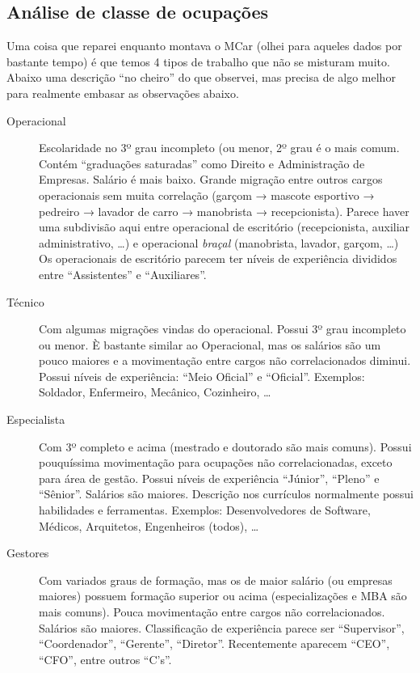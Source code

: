 \documentclass[12pt,a4paper]{article}
\begin{document}
\subsection{Análise de classe de ocupações}

Uma coisa que reparei enquanto montava o MCar (olhei para aqueles dados por bastante tempo) é que temos 4 tipos de trabalho que não se misturam muito. Abaixo uma descrição \enquote{no cheiro} do que observei, mas precisa de algo melhor para realmente embasar as observações abaixo.


\begin{description}
\item [Operacional] Escolaridade no 3º grau incompleto (ou menor, 2º grau é o mais comum. Contém \enquote{graduações saturadas} como Direito e Administração de Empresas. Salário é mais baixo. Grande migração entre outros cargos operacionais sem muita correlação (garçom → mascote esportivo → pedreiro → lavador de carro → manobrista → recepcionista). Parece haver uma subdivisão aqui entre operacional de escritório (recepcionista, auxiliar administrativo, \ldots) e operacional \textit{braçal} (manobrista, lavador, garçom, \ldots) Os operacionais de escritório parecem ter níveis de experiência divididos entre \enquote{Assistentes} e \enquote{Auxiliares}.
\item [Técnico] Com algumas migrações vindas do operacional. Possui 3º grau incompleto ou menor. È bastante similar ao Operacional, mas os salários são um pouco maiores e a movimentação entre cargos não correlacionados diminui. Possui níveis de experiência: \enquote{Meio Oficial} e \enquote{Oficial}. Exemplos: Soldador, Enfermeiro, Mecânico, Cozinheiro, \ldots
\item [Especialista] Com 3º completo e acima (mestrado e doutorado são mais comuns). Possui pouquíssima movimentação para ocupações não correlacionadas, exceto para área de gestão. Possui níveis de experiência \enquote{Júnior}, \enquote{Pleno} e \enquote{Sênior}. Salários são maiores. Descrição nos currículos normalmente possui habilidades e ferramentas. Exemplos: Desenvolvedores de Software, Médicos, Arquitetos, Engenheiros (todos), \ldots
\item [Gestores] Com variados graus de formação, mas os de maior salário (ou empresas maiores) possuem formação superior ou acima (especializações e MBA são mais comuns). Pouca movimentação entre cargos não correlacionados. Salários são maiores. Classificação de experiência parece ser \enquote{Supervisor}, \enquote{Coordenador}, \enquote{Gerente}, \enquote{Diretor}. Recentemente aparecem \enquote{CEO}, \enquote{CFO}, entre outros \enquote{C's}.
\end{description}
\end{document}
